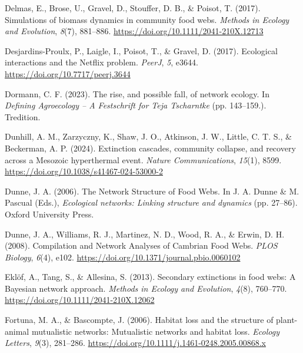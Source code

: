 \documentclass[
]{article}
\newlength{\cslhangindent}
\newenvironment{CSLReferences}[2] %
 {\begin{list}{}{%
  \setlength{\itemindent}{0pt}
  \setlength{\leftmargin}{0pt}
  \setlength{\parsep}{0pt}
  \ifodd #1
   \setlength{\leftmargin}{\cslhangindent}
   \setlength{\itemindent}{-1\cslhangindent}
  \fi
  \setlength{\itemsep}{#2\baselineskip}}}
 {\end{list}}
\begin{document}
\begin{CSLReferences}{1}{0}
Delmas, E., Brose, U., Gravel, D., Stouffer, D. B., \& Poisot, T.
(2017). Simulations of biomass dynamics in community food webs.
\emph{Methods in Ecology and Evolution}, \emph{8}(7), 881--886.
\url{https://doi.org/10.1111/2041-210X.12713}

Desjardins-Proulx, P., Laigle, I., Poisot, T., \& Gravel, D. (2017).
Ecological interactions and the {Netflix} problem. \emph{PeerJ},
\emph{5}, e3644. \url{https://doi.org/10.7717/peerj.3644}

Dormann, C. F. (2023). The rise, and possible fall, of network ecology.
In \emph{Defining {Agroecology} -- {A Festschrift} for {Teja
Tscharntke}} (pp. 143--159.). Tredition.

Dunhill, A. M., Zarzyczny, K., Shaw, J. O., Atkinson, J. W., Little, C.
T. S., \& Beckerman, A. P. (2024). Extinction cascades, community
collapse, and recovery across a {Mesozoic} hyperthermal event.
\emph{Nature Communications}, \emph{15}(1), 8599.
\url{https://doi.org/10.1038/s41467-024-53000-2}

Dunne, J. A. (2006). The {Network Structure} of {Food Webs}. In J. A.
Dunne \& M. Pascual (Eds.), \emph{Ecological networks: {Linking}
structure and dynamics} (pp. 27--86). Oxford University Press.

Dunne, J. A., Williams, R. J., Martinez, N. D., Wood, R. A., \& Erwin,
D. H. (2008). Compilation and {Network Analyses} of {Cambrian Food
Webs}. \emph{PLOS Biology}, \emph{6}(4), e102.
\url{https://doi.org/10.1371/journal.pbio.0060102}

Eklöf, A., Tang, S., \& Allesina, S. (2013). Secondary extinctions in
food webs: A {Bayesian} network approach. \emph{Methods in Ecology and
Evolution}, \emph{4}(8), 760--770.
\url{https://doi.org/10.1111/2041-210X.12062}

Fortuna, M. A., \& Bascompte, J. (2006). Habitat loss and the structure
of plant-animal mutualistic networks: {Mutualistic} networks and habitat
loss. \emph{Ecology Letters}, \emph{9}(3), 281--286.
\url{https://doi.org/10.1111/j.1461-0248.2005.00868.x}


\end{CSLReferences}
\end{document}
